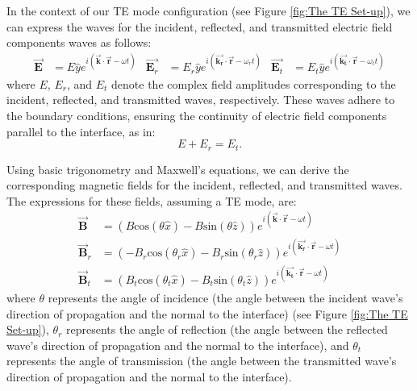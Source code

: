 In the context of our TE mode configuration (see Figure \ref{fig:The TE Set-up}), we can express the waves for the incident, reflected, and transmitted electric field components waves as follows:
    \begin{align*}
    \vec{\mathbf{E}} &= E \hat{y} e^{i(\vec{\mathbf{k}} \cdot \vec{\mathbf{r}} - \omega t)}           &  \vec{\mathbf{E}_r} &= E_r \hat{y} e^{i(\vec{\mathbf{k_r}} \cdot \vec{\mathbf{r}} - \omega_r t)}               &  \vec{\mathbf{E}_t} &= E_t \hat{y} e^{i(\vec{\mathbf{k_t}} \cdot \vec{\mathbf{r}} - \omega_t t)}
    \end{align*}
where $E$, $E_r$, and $E_t$ denote the complex field amplitudes corresponding to the incident, reflected, and transmitted waves, respectively. These waves adhere to the boundary conditions, ensuring the continuity of electric field components parallel to the interface, as in:
\begin{equation} \label{Electric field boundary conditions for TE waves}
E + E_r = E_t.
\end{equation}

Using basic trigonometry and Maxwell's equations, we can derive the corresponding magnetic fields for the incident, reflected, and transmitted waves. The expressions for these fields, assuming a TE mode, are:
\begin{align*} 
\vec{\mathbf{B}} &= (B\mathrm{cos}(\theta \hat{x}) - B\mathrm{sin}(\theta \hat{z})) e^{i(\vec{\mathbf{k}} \cdot \vec{\mathbf{r}} - \omega t)} \\
\vec{\mathbf{B}}_r &= (-B_r\mathrm{cos}(\theta_r \hat{x}) - B_r\mathrm{sin}(\theta_r \hat{z})) e^{i(\vec{\mathbf{k_r}} \cdot \vec{\mathbf{r}} - \omega t)} \\ 
\vec{\mathbf{B}}_t &= (B_t\mathrm{cos}(\theta_t \hat{x}) - B_t\mathrm{sin}(\theta_t \hat{z})) e^{i(\vec{\mathbf{k_t}} \cdot \vec{\mathbf{r}} - \omega t)}
\end{align*} where $\theta$ represents the angle of incidence (the angle between the incident wave's direction of propagation and the normal to the interface) (see Figure \ref{fig:The TE Set-up}), $\theta_r$ represents the angle of reflection (the angle between the reflected wave's direction of propagation and the normal to the interface), and $\theta_t$ represents the angle of transmission (the angle between the transmitted wave's direction of propagation and the normal to the interface).

